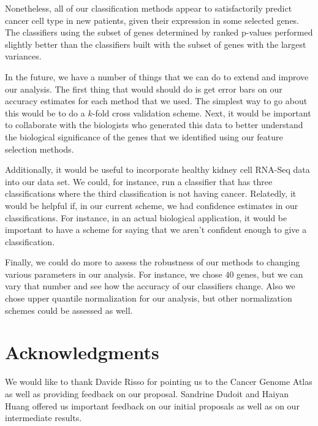 Nonetheless, all of our classification methods appear to satisfactorily predict
cancer cell type in new patients, given their expression in some selected
genes. The classifiers using the subset of genes determined by ranked p-values
performed slightly better than the classifiers built with the subset of genes
with the largest variances.

In the future, we have a number of things that we can do to extend and improve our analysis. The first thing that would should do is get error bars on our accuracy estimates for each method that we used. The simplest way to go about this would be to do a $k$-fold cross validation scheme. Next, it would be important to collaborate with the biologists who generated this data to better understand the biological significance of the genes that we identified using our feature selection methods. 

Additionally, it would be useful to incorporate healthy kidney cell RNA-Seq data into our data set. We could, for instance, run a classifier that has three classifications where the third classification is not having cancer. Relatedly, it would be helpful if, in our current scheme, we had confidence estimates in our classifications. For instance, in an actual biological application, it would be important to have a scheme for saying that we aren't confident enough to give a classification. 

Finally, we could do more to assess the robustness of our methods to changing various parameters in our analysis. For instance, we chose $40$ genes, but we can vary that number and see how the accuracy of our classifiers change. Also we chose upper quantile normalization for our analysis, but other normalization schemes could be assessed as well. 



\section*{Acknowledgments}

We would like to thank Davide Risso for pointing us to the Cancer Genome Atlas
as well as providing feedback on our proposal. Sandrine Dudoit and Haiyan Huang
offered us important feedback on our initial proposals as well as on our
intermediate results. 




